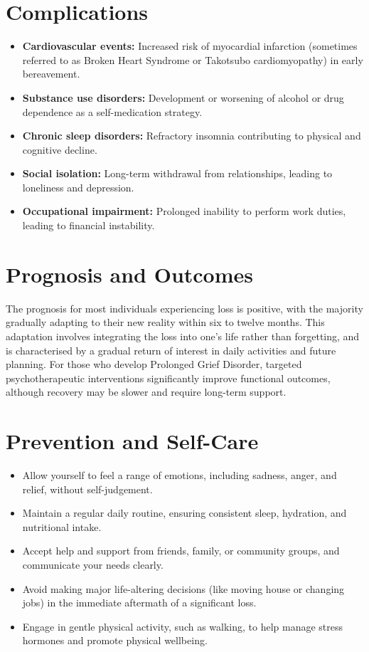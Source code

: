 \section*{Complications}
\begin{itemize}
    \item \textbf{Cardiovascular events:} Increased risk of myocardial infarction (sometimes referred to as Broken Heart Syndrome or Takotsubo cardiomyopathy) in early bereavement.
    \item \textbf{Substance use disorders:} Development or worsening of alcohol or drug dependence as a self-medication strategy.
    \item \textbf{Chronic sleep disorders:} Refractory insomnia contributing to physical and cognitive decline.
    \item \textbf{Social isolation:} Long-term withdrawal from relationships, leading to loneliness and depression.
    \item \textbf{Occupational impairment:} Prolonged inability to perform work duties, leading to financial instability.
\end{itemize}

\section*{Prognosis and Outcomes}
The prognosis for most individuals experiencing loss is positive, with the majority gradually adapting to their new reality within six to twelve months. This adaptation involves integrating the loss into one's life rather than forgetting, and is characterised by a gradual return of interest in daily activities and future planning. For those who develop Prolonged Grief Disorder, targeted psychotherapeutic interventions significantly improve functional outcomes, although recovery may be slower and require long-term support.

\section*{Prevention and Self-Care}
\begin{itemize}
    \item Allow yourself to feel a range of emotions, including sadness, anger, and relief, without self-judgement.
    \item Maintain a regular daily routine, ensuring consistent sleep, hydration, and nutritional intake.
    \item Accept help and support from friends, family, or community groups, and communicate your needs clearly.
    \item Avoid making major life-altering decisions (like moving house or changing jobs) in the immediate aftermath of a significant loss.
    \item Engage in gentle physical activity, such as walking, to help manage stress hormones and promote physical wellbeing.
\end{itemize}

